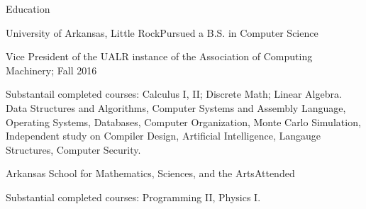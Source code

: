 \documentclass{resume} %
\begin{document}
\begin{rSection}{Education}

\begin{rSubsection}{University of Arkansas, Little Rock}{}{Pursued a B.S. in Computer Science}

	\item Vice President of the UALR instance of the Association of Computing Machinery; Fall 2016
	\item Substantail completed courses: Calculus I, II; Discrete Math; Linear Algebra. Data Structures and Algorithms, Computer Systems and Assembly Language, Operating Systems, Databases, Computer Organization, Monte Carlo Simulation, Independent study on Compiler Design, Artificial Intelligence, Langauge Structures, Computer Security.
\end{rSubsection}

\begin{rSubsection}{Arkansas School for Mathematics, Sciences, and the Arts}{}{Attended}

	\item Substantial completed courses: Programming II, Physics I.
\end{rSubsection}

\end{rSection}
\end{document}
